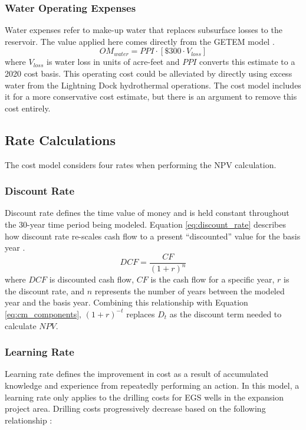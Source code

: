 \subsubsection{Water Operating Expenses}\label{ch4:cm_opex_water}
Water expenses refer to make-up water that replaces subsurface losses to the reservoir. The value applied here comes directly from the GETEM model \citep{eere_getem_2012}.
\begin{equation}
\label{eq:cm_om_water}
    OM_{water} = PPI \cdot \left[\$300 \cdot V_{loss}\right]
\end{equation}
where $V_{loss}$ is water loss in units of acre-feet and $PPI$ converts this estimate to a 2020 cost basis. This operating cost could be alleviated by directly using excess water from the Lightning Dock hydrothermal operations. The cost model includes it for a more conservative cost estimate, but there is an argument to remove this cost entirely.

\subsection{Rate Calculations}\label{ch4:cm_rate_calcs}
The cost model considers four rates when performing the NPV calculation.

\subsubsection{Discount Rate}\label{ch4:discount_rate}
Discount rate defines the time value of money and is held constant throughout the 30-year time period being modeled. Equation \ref{eq:discount_rate} describes how discount rate re-scales cash flow to a present ``discounted'' value for the basis year \citep[p.\ 199]{de_neufville_flexibility_2011}.
\begin{equation}
    \label{eq:discount_rate}
    DCF = \frac{CF}{(1+r)^n}
\end{equation}
where $DCF$ is discounted cash flow, $CF$ is the cash flow for a specific year,  $r$ is the discount rate, and $n$ represents the number of years between the modeled year and the basis year. Combining this relationship with Equation \ref{eq:cm_components}, $(1+r)^{-t}$ replaces $D_t$ as the discount term needed to calculate $NPV$.

\subsubsection{Learning Rate}\label{ch4:learn_rate}
Learning rate defines the improvement in cost as a result of accumulated knowledge and experience from repeatedly performing an action. In this model, a learning rate only applies to the drilling costs for EGS wells in the expansion project area. Drilling costs progressively decrease based on the following relationship \citep[p.\ 213]{de_neufville_flexibility_2011}:


